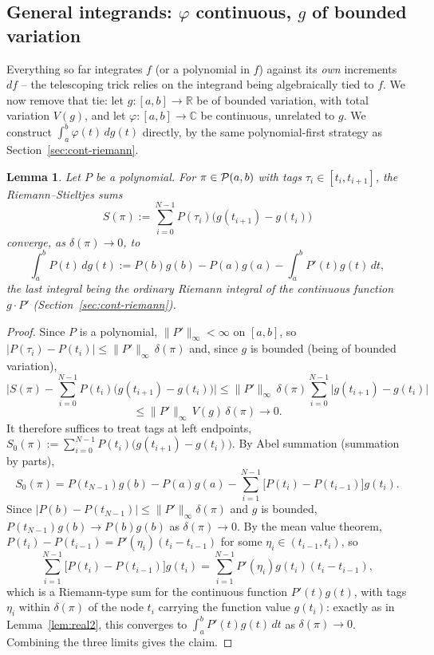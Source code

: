 \documentclass[11pt,fleqn]{article}
\def\C{\mathbb C}
\def\R{\mathbb R}
\theoremstyle{plain}
\newtheorem{lemma}[thm]{Lemma}
\theoremstyle{remark}
\begin{document}
\subsection{General integrands: $\varphi$ continuous, $g$ of bounded variation}
\label{sec:rs-bv}

Everything so far integrates $f$ (or a polynomial in $f$) against its
\emph{own} increments $df$ -- the telescoping trick relies on the
integrand being algebraically tied to $f$. We now remove that tie: let
$g\colon[a,b]\to\R$ be of bounded variation, with total variation $V(g)$,
and let $\varphi\colon[a,b]\to\C$ be continuous, unrelated to $g$. We
construct $\int_a^b\varphi(t)\,dg(t)$ directly, by the same
polynomial-first strategy as Section~\ref{sec:cont-riemann}.

\begin{lemma}\label{lem:rs-poly}
Let $P$ be a polynomial. For $\pi\in{\cal P}(a,b)$ with tags
$\tau_i\in[t_i,t_{i+1}]$, the Riemann--Stieltjes sums
\[
S(\pi):=\sum_{i=0}^{N-1}P(\tau_i)\big(g(t_{i+1})-g(t_i)\big)
\]
converge, as $\delta(\pi)\to0$, to
\[
\int_a^bP(t)\,dg(t):=P(b)g(b)-P(a)g(a)-\int_a^bP'(t)g(t)\,dt,
\]
the last integral being the ordinary Riemann integral of the continuous
function $g\cdot P'$ (Section~\ref{sec:cont-riemann}).
\end{lemma}
\begin{proof}
Since $P$ is a polynomial, $\|P'\|_\infty<\infty$ on $[a,b]$, so
$|P(\tau_i)-P(t_i)|\le\|P'\|_\infty\,\delta(\pi)$ and, since $g$ is
bounded (being of bounded variation),
\[
\Big|S(\pi)-\sum_{i=0}^{N-1}P(t_i)\big(g(t_{i+1})-g(t_i)\big)\Big|
\le\|P'\|_\infty\,\delta(\pi)\sum_{i=0}^{N-1}\big|g(t_{i+1})-g(t_i)\big|
\]
\[
\le\|P'\|_\infty\,V(g)\,\delta(\pi)\longrightarrow0.
\]
It therefore suffices to treat tags at left endpoints,
$S_0(\pi):=\sum_{i=0}^{N-1}P(t_i)\big(g(t_{i+1})-g(t_i)\big)$. By Abel
summation (summation by parts),
\[
S_0(\pi)=P(t_{N-1})g(b)-P(a)g(a)-\sum_{i=1}^{N-1}\big[P(t_i)-P(t_{i-1})\big]g(t_i).
\]
Since $|P(b)-P(t_{N-1})|\le\|P'\|_\infty\delta(\pi)$ and $g$ is bounded,
$P(t_{N-1})g(b)\to P(b)g(b)$ as $\delta(\pi)\to0$. By the mean value
theorem, $P(t_i)-P(t_{i-1})=P'(\eta_i)(t_i-t_{i-1})$ for some
$\eta_i\in(t_{i-1},t_i)$, so
\[
\sum_{i=1}^{N-1}\big[P(t_i)-P(t_{i-1})\big]g(t_i)
=\sum_{i=1}^{N-1}P'(\eta_i)g(t_i)(t_i-t_{i-1}),
\]
which is a Riemann-type sum for the continuous function $P'(t)g(t)$, with
tags $\eta_i$ within $\delta(\pi)$ of the node $t_i$ carrying the function
value $g(t_i)$: exactly as in Lemma~\ref{lem:real2}, this converges to
$\int_a^bP'(t)g(t)\,dt$ as $\delta(\pi)\to0$. Combining the three limits
gives the claim.
\end{proof}
\end{document}
